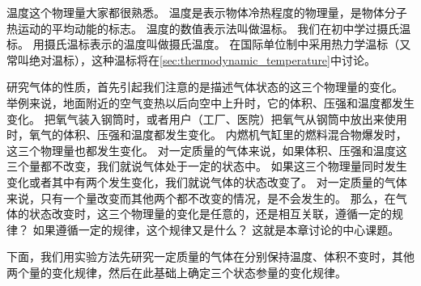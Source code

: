 温度这个物理量大家都很熟悉。
温度是表示物体冷热程度的物理量，是物体分子热运动的平均动能的标志。
温度的数值表示法叫做温标。
我们在初中学过摄氏温标。
用摄氏温标表示的温度叫做摄氏温度。
在国际单位制中采用热力学温标（又常叫绝对温标），这种温标将在\cref{sec:thermodynamic_temperature}中讨论。

研究气体的性质，首先引起我们注意的是描述气体状态的这三个物理量的变化。
举例来说，地面附近的空气变热以后向空中上升时，它的体积、压强和温度都发生变化。
把氧气装入钢筒时，或者用户（工厂、医院）把氧气从钢筒中放出来使用时，氧气的体积、压强和温度都发生变化。
内燃机气缸里的燃料混合物爆发时，这三个物理量也都发生变化。
对一定质量的气体来说，如果体积、压强和温度这三个量都不改变，我们就说气体处于一定的状态中。
如果这三个物理量同时发生变化或者其中有两个发生变化，我们就说气体的状态改变了。
对一定质量的气体来说，只有一个量改变而其他两个都不改变的情况，是不会发生的。
那么，在气体的状态改变时，这三个物理量的变化是任意的，还是相互关联，遵循一定的规律？
如果遵循一定的规律，这个规律又是什么？
这就是本章讨论的中心课题。

下面，我们用实验方法先研究一定质量的气体在分别保持温度、体积不变时，其他两个量的变化规律，然后在此基础上确定三个状态参量的变化规律。

